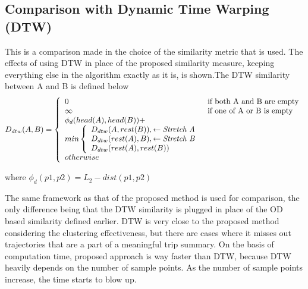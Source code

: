 \subsection{Comparison with Dynamic Time Warping (DTW)}
This is a comparison made in the choice of the similarity metric that is used. The effects of using DTW in place of the proposed similarity measure, keeping everything else in the algorithm exactly as it is, is shown.The DTW similarity between A and B is defined below 
\begin{equation}
D_{dtw}(A,B) =
\left\{
	\begin{array}{ll}
		0  & \mbox{if } \text{both A and B are empty} \\
		\infty & \mbox{if } \text{one of A or B is empty}\\
                \phi _d (head(A),head(B))+
                   \\min 
\left\{
	\begin{array}{ll}
		D_{dtw}(A,rest(B)), \leftarrow \text{\emph{Stretch A}}\\

		D_{dtw}(rest(A),B),\leftarrow \text{\emph{Stretch B}}\\
                D_{dtw}(rest(A),rest(B)) 
	\end{array}
\right.          \\otherwise
	\end{array}
\right.
\end{equation}

where $\phi_d(p1,p2)=L_2-dist(p1,p2)$ 

The same framework as that of the proposed method is used for comparison, the only difference being that the DTW similarity is plugged in place of the OD based similarity defined earlier. DTW is very close to the proposed method considering the clustering effectiveness, but there are cases where it misses out trajectories that are a part of a meaningful trip summary. On the basis of computation time, proposed approach is way faster than DTW, because DTW heavily depends on the number of sample points. As the number of sample points increase, the time starts to blow up.

